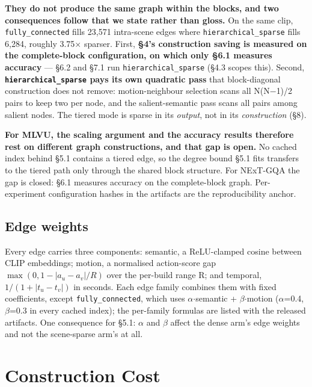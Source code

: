 \documentclass[sigconf,review,anonymous]{acmart}
\begin{document}
\textbf{They do not produce the same graph within the blocks, and two consequences follow that we
state rather than gloss.} On the same clip, \texttt{fully\_connected} fills 23,571 intra-scene edges
where \texttt{hierarchical\_sparse} fills 6,284, roughly 3.75\ensuremath{\times} sparser. First, \textbf{§4's construction
saving is measured on the complete-block configuration, on which only §6.1 measures
accuracy} --- §6.2 and §7.1 run \texttt{hierarchical\_sparse} (§4.3 scopes this). Second,
\textbf{\texttt{hierarchical\_sparse} pays its own quadratic pass} that block-diagonal construction does
not remove: motion-neighbour selection scans all N(N\ensuremath{-}1)/2 pairs to keep two per node, and the
salient-semantic pass scans all pairs among salient nodes. The tiered mode is sparse in its
\emph{output}, not in its \emph{construction} (§8).

\textbf{For MLVU, the scaling argument and the accuracy results therefore rest on different
graph constructions, and that gap is open.} No cached index behind §5.1 contains a tiered edge,
so the degree bound §5.1 fits transfers to the tiered path only through the shared block
structure. For NExT-GQA the gap is closed: §6.1 measures accuracy on the complete-block graph.
Per-experiment configuration hashes in the artifacts are the reproducibility anchor.

\subsection{Edge weights}

Every edge carries three components: semantic, a ReLU-clamped cosine between CLIP embeddings;
motion, a normalised action-score gap \(\max(0, 1 - |a_u - a_v|/R)\) over the per-build range
R; and temporal, \(1/(1 + |t_u - t_v|)\) in seconds. Each edge family combines them with fixed
coefficients, except \texttt{fully\_connected}, which uses \ensuremath{\alpha}\ensuremath{\cdot}semantic + \ensuremath{\beta}\ensuremath{\cdot}motion (\ensuremath{\alpha}=0.4, \ensuremath{\beta}=0.3 in
every cached index); the per-family formulas are listed with the released artifacts. One
consequence for §5.1: \ensuremath{\alpha} and \ensuremath{\beta} affect the dense arm's edge weights and not the scene-sparse
arm's at all.

\section{Construction Cost}
\end{document}
